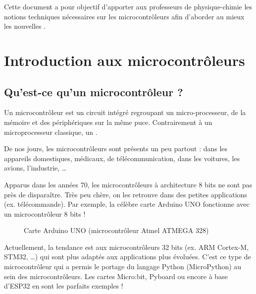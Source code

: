 \documentclass[a4paper,10pt,french]{book}
\let\sphinxpxdimen\pdfpxdimen\else\newdimen\sphinxpxdimen
\begin{document}
Cette document a pour objectif d’apporter aux professeurs de physique-chimie les notions techniques nécessaires sur les microcontrôleurs afin d’aborder au mieux les nouvelles .


\chapter{Introduction aux microcontrôleurs}
\label{\detokenize{1_introduction/introduction:introduction-aux-microcontroleurs}}\label{\detokenize{1_introduction/introduction::doc}}

\section{Qu’est-ce qu’un microcontrôleur ?}
\label{\detokenize{1_introduction/introduction:qu-est-ce-qu-un-microcontroleur}}
Un microcontrôleur est un circuit intégré regroupant un micro-processeur, de la mémoire et des périphériques sur la même puce. Contrairement à un microprocesseur classique, un .

De nos jours, les microcontrôleurs sont présents un peu partout : dans les appareils domestiques, médicaux, de télécommunication, dans les voitures, les avions, l’industrie, …

Apparus dans les années 70, les microcontrôleurs à architecture 8 bits ne sont pas près de disparaître. Très peu chère, on les retrouve dans des petites applications (ex. télécommande). Par exemple, la célèbre carte Arduino UNO fonctionne avec un microcontrôleur 8 bits !

\begin{figure}[H]
\centering
\capstart

\noindent\sphinxincludegraphics[width=400.00000\sphinxpxdimen,height=266.50000\sphinxpxdimen]{{Arduino_Uno_rev3_wikipedia}.jpg}
\caption{Carte Arduino UNO (microcontrôleur Atmel ATMEGA 328)}\label{\detokenize{1_introduction/introduction:id1}}\end{figure}

Actuellement, la tendance est aux microcontrôleurs 32 bits (ex. ARM Cortex-M, STM32, …) qui sont plus adaptés aux applications plus évoluées. C’est ce type de microcontrôleur qui a permis le portage du langage Python (MicroPython) au sein des microcontrôleurs. Les cartes Micro:bit, Pyboard ou encore à base d’ESP32 en sont les parfaits exemples !
\end{document}
